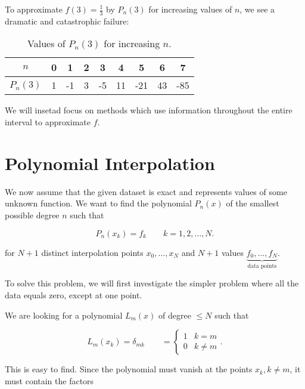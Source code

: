 To approximate $f(3)=\frac{1}{3}$ by $P_n(3)$ for increasing values of $n$, we
see a dramatic and catastrophic failure: 

\begin{table}[h]
    \centering
    \renewcommand{\arraystretch}{1.4}
    \begin{tabular}{|c|c|c|c|c|c|c|c|c|}
        \hline
        \( n \) & 0 & 1 & 2 & 3 & 4 & 5 & 6 & 7 \\ 
        \hline
        \( P_n(3) \) & 1 & -1 & 3 & -5 & 11 & -21 & 43 & -85 \\ 
        \hline
    \end{tabular}
    \caption{Values of \( P_n(3) \) for increasing \( n \).}
\end{table}

We will insetad focus on methods which use information throughout the entire 
interval to approximate $f$.

\section{Polynomial Interpolation}

We now assume that the given dataset is exact and represents values of some
unknown function. We want to find the polynomial $P_n(x)$ of the smallest 
possible degree $n$ such that

\[
P_n(x_k) = f_k \qquad k = 1,2, \dots, N
.\]

for $N+1$ distinct interpolation points $x_0,\dots,x_N$ and $N+1$ values 
$\underbrace{f_0,\dots,f_N}_{\text{data points}}$.

To solve this problem, we will first investigate the simpler problem where all
the data equals zero, except at one point.

We are looking for a polynomial $L_m(x)$ of degree $\leq N$ such that

\[
  L_m(x_k) = \delta_{mk} \qquad = \begin{cases}
    1 & k = m \\
    0 & k \neq m
    \end{cases}
.\]


\begin{center}
\end{center}

This is easy to find. Since the polynomial must vanish at the points 
$x_k, k\neq m$, it must contain the factors

